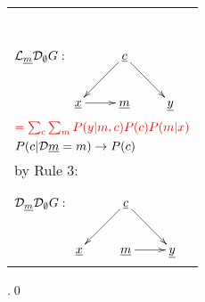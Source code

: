 \begin{longtable}{l}
\begin{tabular}{l}
\end{tabular}
\\
\quad
${\cal L}_{\underline{m}} {\cal D}_\emptyset G:$
$\xymatrix{
&{\rvc}\ar[rd]\ar[ld]
\\
\rvx\ar[r]
&\rvm
&\rvy
}$
\\
$\color{red}=
\sum_{c}
\sum_m
P(y|m, c)
P(c)
P(m|x)$
\\
\quad $P(c|{\cal D}{\underline{m}}=m)
\rightarrow
P(c)$
\\
\quad by Rule 3:
\begin{tabular}{l}
\\
\end{tabular}
\\
\quad
${\cal D}_{\underline{m}} {\cal D}_\emptyset G:$
$\xymatrix{
&{\rvc}\ar[rd]\ar[ld]
\\
\rvx
&\rvm\ar[r]
&\rvy
}$
\end{longtable}
.\qed


